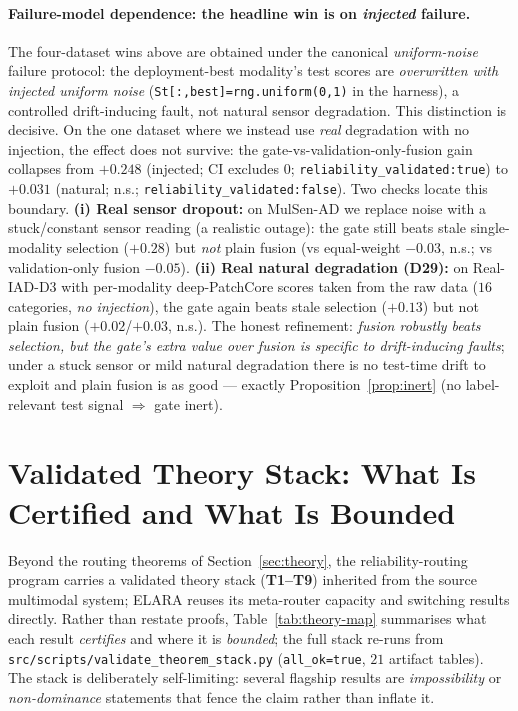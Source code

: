 \documentclass[10pt,conference]{IEEEtran}
\newcommand{\systemu}{ELARA}
\begin{document}
\paragraph{Failure-model dependence: the headline win is on \emph{injected} failure.}
The four-dataset wins above are obtained under the canonical \emph{uniform-noise}
failure protocol: the deployment-best modality's test scores are \emph{overwritten
with injected uniform noise} (\texttt{St[:,best]=rng.uniform(0,1)} in the harness), a
controlled drift-inducing fault, not natural sensor degradation. This distinction is
decisive. On the one dataset where we instead use \emph{real} degradation with no
injection, the effect does not survive: the gate-vs-validation-only-fusion gain
collapses from $+0.248$ (injected; CI excludes $0$;
\texttt{reliability\_validated:true}) to $+0.031$ (natural; n.s.;
\texttt{reliability\_validated:false}). Two checks locate this boundary.
\textbf{(i) Real sensor dropout:} on MulSen-AD we replace noise with a stuck/constant
sensor reading (a realistic outage): the gate still beats stale single-modality
selection ($+0.28$) but \emph{not} plain fusion (vs equal-weight $-0.03$, n.s.; vs
validation-only fusion $-0.05$). \textbf{(ii) Real natural degradation (D29):} on
Real-IAD-D3 with per-modality deep-PatchCore scores taken from the raw data ($16$
categories, \emph{no injection}), the gate again beats stale selection ($+0.13$) but
not plain fusion ($+0.02$/$+0.03$, n.s.). The honest refinement: \emph{fusion robustly
beats selection, but the gate's extra value over fusion is specific to drift-inducing
faults}; under a stuck sensor or mild natural degradation there is no test-time drift to
exploit and plain fusion is as good --- exactly Proposition~\ref{prop:inert} (no
label-relevant test signal $\Rightarrow$ gate inert).

\section{Validated Theory Stack: What Is Certified and What Is Bounded}
\label{sec:theory-stack}
Beyond the routing theorems of Section~\ref{sec:theory}, the reliability-routing program
carries a validated theory stack (\textbf{T1--T9}) inherited from the source multimodal
system; \systemu{} reuses its meta-router capacity and switching results directly. Rather
than restate proofs, Table~\ref{tab:theory-map} summarises what each result
\emph{certifies} and where it is \emph{bounded}; the full stack re-runs from
\texttt{src/scripts/validate\_theorem\_stack.py} (\texttt{all\_ok=true}, $21$ artifact
tables). The stack is deliberately self-limiting: several flagship results are
\emph{impossibility} or \emph{non-dominance} statements that fence the claim rather than
inflate it.
\end{document}
